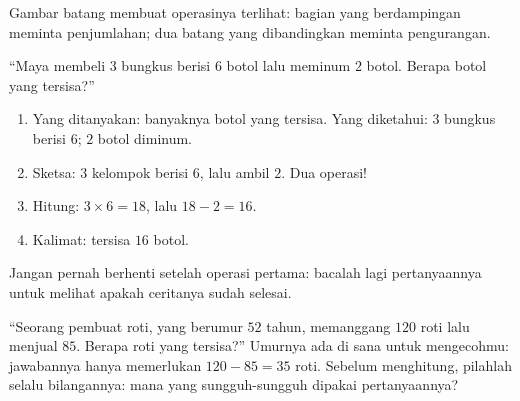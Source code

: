 \begin{omfigure}

{\small Gambar batang membuat operasinya terlihat: bagian yang
berdampingan meminta penjumlahan; dua batang yang dibandingkan
meminta pengurangan.}
\end{omfigure}

\begin{example}\label{ex:g3:problems:twostep}
``Maya membeli $3$ bungkus berisi $6$ botol lalu meminum $2$ botol.
Berapa botol yang tersisa?''
\begin{enumerate}
  \item Yang ditanyakan: banyaknya botol yang tersisa. Yang
        diketahui: $3$ bungkus berisi $6$; $2$ botol diminum.
  \item Sketsa: $3$ kelompok berisi $6$, lalu ambil $2$. Dua operasi!
  \item Hitung: $3 \times 6 = 18$, lalu $18 - 2 = 16$.
  \item Kalimat: tersisa $16$ botol.
\end{enumerate}
Jangan pernah berhenti setelah operasi pertama: bacalah lagi
pertanyaannya untuk melihat apakah ceritanya sudah selesai.
\end{example}

\begin{example}\label{ex:g3:problems:trap}
``Seorang pembuat roti, yang berumur $52$ tahun, memanggang $120$ roti
lalu menjual $85$. Berapa roti yang tersisa?'' Umurnya ada di sana
untuk mengecohmu: jawabannya hanya memerlukan $120 - 85 = 35$ roti.
Sebelum menghitung, pilahlah selalu bilangannya: mana yang
sungguh-sungguh dipakai pertanyaannya?
\end{example}

